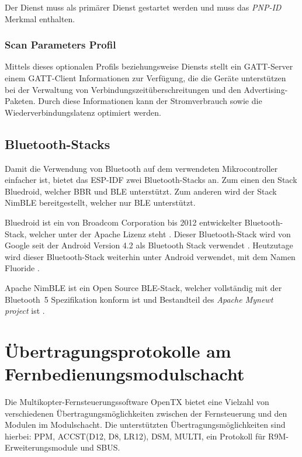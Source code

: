 Der Dienst muss als primärer Dienst gestartet werden und muss das \textit{PNP-ID} Merkmal enthalten. \cite[S.~14f.]{bluetoothHOGP}

\subsubsection{Scan Parameters Profil}
Mittels dieses optionalen Profils beziehungsweise Diensts stellt ein \acs{GATT}-Server einem \acs{GATT}-Client Informationen zur Verfügung, die die Geräte unterstützen bei der Verwaltung von Verbindungszeitüberschreitungen und den Advertising-Paketen. Durch diese Informationen kann der Stromverbrauch sowie die Wiederverbindungslatenz optimiert werden. \cite[S.~6]{bluetoothScan}

\subsection{Bluetooth-Stacks}
\label{section:bluetoothStacks}

Damit die Verwendung von Bluetooth auf dem verwendeten Mikrocontroller einfacher ist, bietet das \ac{ESP-IDF} zwei Bluetooth-Stacks an. Zum einen den Stack Bluedroid, welcher \ac{BBR} und \ac{BLE} unterstützt. Zum anderen wird der Stack NimBLE bereitgestellt, welcher nur \ac{BLE} unterstützt. \cite{espidfBluetoothStack}

Bluedroid ist ein von Broadcom Corporation bis 2012 entwickelter Bluetooth-Stack, welcher unter der Apache Lizenz steht \cite{bluedroidlizenz}. Dieser Bluetooth-Stack wird von Google seit der Android Version 4.2 als Bluetooth Stack verwendet \cite{lwnBluedroid}. Heutzutage wird dieser Bluetooth-Stack weiterhin unter Android verwendet, mit dem Namen Fluoride \cites{aospFluoride}{anachaoFluoride}.

Apache NimBLE ist ein Open Source \ac{BLE}-Stack, welcher vollständig mit der Bluetooth~5 Spezifikation konform ist \cite{docnimble} und Bestandteil des \textit{Apache Mynewt project} ist \cite{gitnimble}.


\section{Übertragungsprotokolle am Fernbedienungsmodulschacht}
\label{section:communicationsProtocollsRemote}

Die Multikopter-Fernsteuerungssoftware OpenTX bietet eine Vielzahl von verschiedenen Übertragungsmöglichkeiten zwischen der Fernsteuerung und den Modulen im Modulschacht. Die unterstützten Übertragungsmöglichkeiten sind hierbei: \ac{PPM}, ACCST(D12, D8, LR12)\cite{liangRCProtocols}, DSM, MULTI, ein Protokoll für R9M-Erweiterungsmodule \cite{frskyr9m} und SBUS. \cite{opentxsetup}

